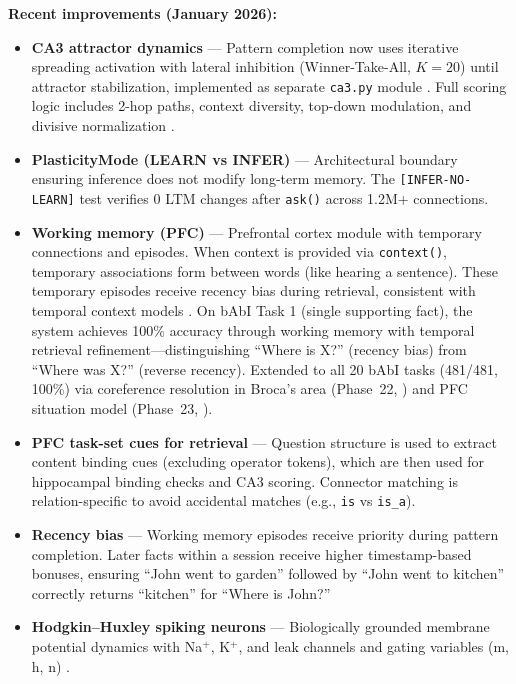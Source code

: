 \documentclass[11pt]{article}
\begin{document}
\textbf{Recent improvements (January 2026):}
\begin{itemize}
\item \textbf{CA3 attractor dynamics} --- Pattern completion now uses iterative spreading activation with lateral inhibition
      (Winner-Take-All, $K=20$) until attractor stabilization, implemented as separate \texttt{ca3.py} module
      \citep{rolls2007attractor,rolls2013mechanisms}. Full scoring logic includes 2-hop paths, context diversity,
      top-down modulation, and divisive normalization \citep{carandini2012normalization}.
\item \textbf{PlasticityMode (LEARN vs INFER)} --- Architectural boundary ensuring inference does not modify long-term memory.
      The \texttt{[INFER-NO-LEARN]} test verifies 0 LTM changes after \texttt{ask()} across 1.2M+ connections.
\item \textbf{Working memory (PFC)} --- Prefrontal cortex module with temporary connections and episodes.
      When context is provided via \texttt{context()}, temporary associations form between words (like hearing a sentence).
      These temporary episodes receive recency bias during retrieval, consistent with temporal context models \citep{howard2002distributed}.
      On bAbI Task 1 (single supporting fact), the system achieves 100\% accuracy through working memory with temporal retrieval refinement---distinguishing ``Where is X?'' (recency bias) from ``Where was X?'' (reverse recency).
      Extended to all 20 bAbI tasks (481/481, 100\%) via coreference resolution in Broca's area (Phase~22, \citealt{hagoort2005broca}) and PFC situation model (Phase~23, \citealt{baddeley2000episodic}).
\item \textbf{PFC task-set cues for retrieval} --- Question structure is used to extract content binding cues (excluding operator tokens), which are then used for hippocampal binding checks and CA3 scoring. Connector matching is relation-specific to avoid accidental matches (e.g., \texttt{is} vs \texttt{is\_a}).
\item \textbf{Recency bias} --- Working memory episodes receive priority during pattern completion.
      Later facts within a session receive higher timestamp-based bonuses, ensuring ``John went to garden'' followed by
      ``John went to kitchen'' correctly returns ``kitchen'' for ``Where is John?''
\item \textbf{Hodgkin--Huxley spiking neurons} --- Biologically grounded membrane potential dynamics with Na$^+$, K$^+$,
      and leak channels and gating variables (m, h, n) \citep{hodgkin1952quantitative}.

\end{itemize}
\end{document}
